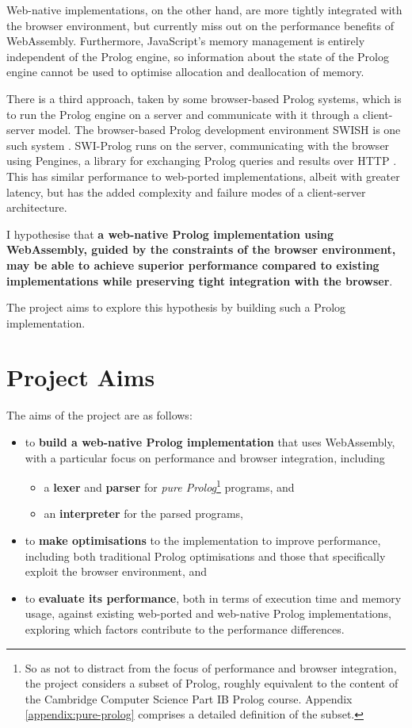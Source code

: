 Web-native implementations, on the other hand, are more tightly integrated with the browser environment, but currently miss out on the performance benefits of WebAssembly. Furthermore, JavaScript's memory management is entirely independent of the Prolog engine, so information about the state of the Prolog engine cannot be used to optimise allocation and deallocation of memory.

There is a third approach, taken by some browser-based Prolog systems, which is to run the Prolog engine on a server and communicate with it through a client-server model. The browser-based Prolog development environment SWISH is one such system \cite{wielemakerSWISHSWIPrologSharing2015}. SWI-Prolog runs on the server, communicating with the browser using Pengines, a library for exchanging Prolog queries and results over HTTP \cite{lagerPenginesWebLogic2014}. This has similar performance to web-ported implementations, albeit with greater latency, but has the added complexity and failure modes of a client-server architecture.

I hypothesise that \textbf{a web-native Prolog implementation using WebAssembly, guided by the constraints of the browser environment, may be able to achieve superior performance compared to existing implementations while preserving tight integration with the browser}.

The project aims to explore this hypothesis by building such a Prolog implementation.

\newpage

\section{Project Aims}

The aims of the project are as follows:

\begin{itemize}
\item to \textbf{build a web-native Prolog implementation} that uses WebAssembly, with a particular focus on performance and browser integration, including
\begin{itemize}
\item a \textbf{lexer} and \textbf{parser} for \emph{pure Prolog}\footnote{So as not to distract from the focus of performance and browser integration, the project considers a subset of Prolog, roughly equivalent to the content of the Cambridge Computer Science Part IB Prolog course. Appendix \ref{appendix:pure-prolog} comprises a detailed definition of the subset.} programs, and
\item an \textbf{interpreter} for the parsed programs,
\end{itemize}
\item to \textbf{make optimisations} to the implementation to improve performance, including both traditional Prolog optimisations and those that specifically exploit the browser environment, and
\item to \textbf{evaluate its performance}, both in terms of execution time and memory usage, against existing web-ported and web-native Prolog implementations, exploring which factors contribute to the performance differences.
\end{itemize}

